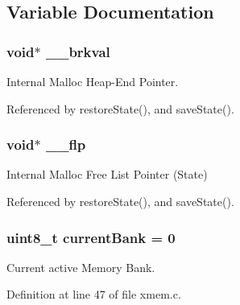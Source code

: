 \subsection{Variable Documentation}
\hypertarget{group__xmem_ga8d18204366e8a385c441663ed41f1ae4}{
\subsubsection[{\-\_\-\-\_\-brkval}]{\setlength{\rightskip}{0pt plus 5cm}void$\ast$ \-\_\-\-\_\-brkval}}\label{group__xmem_ga8d18204366e8a385c441663ed41f1ae4}


Internal Malloc Heap-\/\-End Pointer. 



Referenced by restore\-State(), and save\-State().

\hypertarget{group__xmem_gadc2de04ee0c18717273d0ab52fd6dc1b}{
\subsubsection[{\-\_\-\-\_\-flp}]{\setlength{\rightskip}{0pt plus 5cm}void$\ast$ \-\_\-\-\_\-flp}}\label{group__xmem_gadc2de04ee0c18717273d0ab52fd6dc1b}


Internal Malloc Free List Pointer (State) 



Referenced by restore\-State(), and save\-State().

\hypertarget{group__xmem_ga4a1acf2db179d35f089bd00881d1c2eb}{
\subsubsection[{current\-Bank}]{\setlength{\rightskip}{0pt plus 5cm}uint8\-\_\-t current\-Bank = 0}}\label{group__xmem_ga4a1acf2db179d35f089bd00881d1c2eb}


Current active Memory Bank. 



Definition at line 47 of file xmem.\-c.



